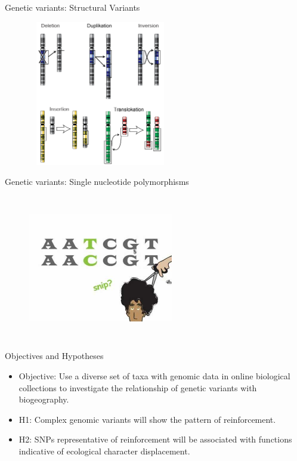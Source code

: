 \documentclass[t,10pt]{beamer}
\begin{document}
\begin{frame}[label={sec:orgheadline29}]{Genetic variants: Structural Variants}
\begin{figure}[htb]
\centering
\includegraphics[width=2.5in,height=2.5in]{./Figures/Chromosomenmutationen.png}
\end{figure}
\end{frame}

\begin{frame}[label={sec:orgheadline30}]{Genetic variants: Single nucleotide polymorphisms}
\begin{figure}[htb]
\centering
\includegraphics[width=2.5in,height=2.5in]{./Figures/SNP.jpg}
\end{figure}
\end{frame}


\begin{frame}[<+->][label={sec:orgheadline31}]{Objectives and Hypotheses}
\begin{itemize}
\item Objective: Use a diverse set of taxa with genomic data in online biological collections to investigate the relationship of genetic variants with biogeography. \vspace{0.25in}

\item H1: Complex genomic variants will show the pattern of \alert{reinforcement}. \vspace{0.25in}

\item H2: SNPs representative of \alert{reinforcement} will be associated with functions indicative of ecological character displacement. \vspace{0.25in}
\end{itemize}
\end{frame}
\end{document}
